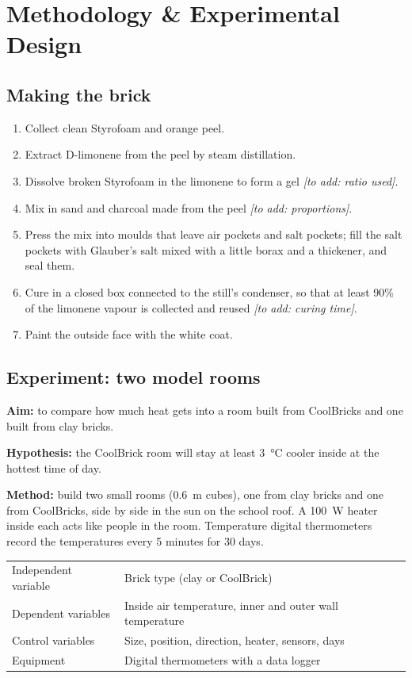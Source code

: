\documentclass[11pt,a4paper]{article}
\let\origsection\section
\renewcommand{\section}{\clearpage\origsection}
\newcommand{\toadd}[1]{\textit{\color{soft}[to add: #1]}}
\begin{document}
\section{Methodology \& Experimental Design}

\subsection{Making the brick}
\begin{enumerate}
  \item Collect clean Styrofoam and orange peel.
  \item Extract D-limonene from the peel by steam distillation.
  \item Dissolve broken Styrofoam in the limonene to form a gel \toadd{ratio used}.
  \item Mix in sand and charcoal made from the peel \toadd{proportions}.
  \item Press the mix into moulds that leave air pockets and salt pockets;
        fill the salt pockets with Glauber's salt mixed with a little borax and
        a thickener, and seal them.
  \item Cure in a closed box connected to the still's condenser, so that
        at least 90\% of the limonene vapour is collected and reused
        \toadd{curing time}.
  \item Paint the outside face with the white coat.
\end{enumerate}

\subsection{Experiment: two model rooms}
\textbf{Aim:} to compare how much heat gets into a room built from CoolBricks
and one built from clay bricks.

\textbf{Hypothesis:} the CoolBrick room will stay at least \SI{3}{\celsius}
cooler inside at the hottest time of day.

\textbf{Method:} build two small rooms (\SI{0.6}{m} cubes), one from clay
bricks and one from CoolBricks, side by side in the sun on the school roof. A
\SI{100}{W} heater inside each acts like people in the room. Temperature
digital thermometers record the temperatures every 5 minutes for 30 days.

\begin{center}
\begin{tabularx}{\textwidth}{@{}l X@{}}
\toprule
Independent variable & Brick type (clay or CoolBrick) \\
Dependent variables & Inside air temperature, inner and outer wall temperature \\
Control variables & Size, position, direction, heater, sensors, days \\
Equipment & Digital thermometers with a data logger \\
\bottomrule
\end{tabularx}
\end{center}
\end{document}

